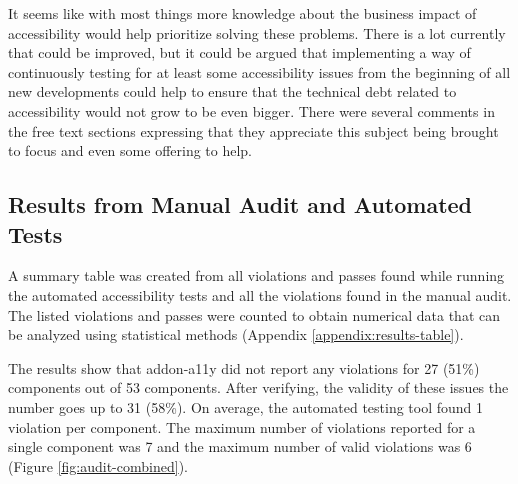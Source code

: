 \documentclass{master_thesis}
\begin{document}
It seems like with most things more knowledge about the business impact of accessibility would help prioritize solving these problems. There is a lot currently that could be improved, but it could be argued that implementing a way of continuously testing for at least some accessibility issues from the beginning of all new developments could help to ensure that the technical debt related to accessibility would not grow to be even bigger. There were several comments in the free text sections expressing that they appreciate this subject being brought to focus and even some offering to help.

\subsection{Results from Manual Audit and Automated Tests}

A summary table was created from all violations and passes found while running the automated accessibility tests and all the violations found in the manual audit. The listed violations and passes were counted to obtain numerical data that can be analyzed using statistical methods (Appendix \ref{appendix:results-table}).

The results show that addon-a11y did not report any violations for 27 (51\%) components out of 53 components. After verifying, the validity of these issues the number goes up to 31 (58\%). On average, the automated testing tool found 1 violation per component. The maximum number of violations reported for a single component was 7 and the maximum number of valid violations was 6 (Figure \ref{fig:audit-combined}).
\end{document}
